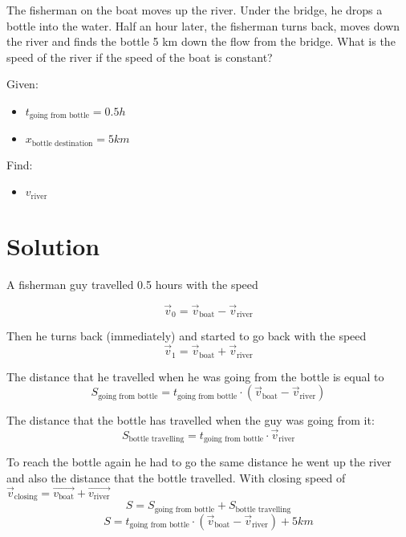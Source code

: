 The fisherman on the boat moves up the river. Under the bridge, he drops a bottle into the water.
Half an hour later, the fisherman turns back, moves down the river and finds the bottle 5 km
down the flow from the bridge. What is the speed of the river if the speed of the boat is constant?

\bigbreak Given: \begin{itemize}
    \item $t_{\text{going from bottle}} = 0.5h$
    \item $x_{\text{bottle destination}} = 5km$
\end{itemize}

Find: \begin{itemize}
    \item $v_{\text{river}}$
\end{itemize}

\section*{Solution}

A fisherman guy travelled 0.5 hours with the speed

$$\Vec{v}_0 = \Vec{v}_{\text{boat}} - \Vec{v}_{\text{river}}$$

Then he turns back (immediately) and started to go back with the speed
\begin{equation}
    \label{eq:1}
    \Vec{v}_1 = \Vec{v}_{\text{boat}} + \Vec{v}_{\text{river}}
\end{equation}

The distance that he travelled when he was going from the bottle is equal to
$$S_{\text{going from bottle}} = t_{\text{going from bottle}} \cdot (\Vec{v}_{\text{boat}} - \Vec{v}_{\text{river}})$$

The distance that the bottle has travelled when the guy was going from it:
$$S_{\text{bottle travelling}} = t_{\text{going from bottle}} \cdot \Vec{v}_{\text{river}}$$

To reach the bottle again he had to go the same distance he went up the river and also the distance that the bottle travelled.
With closing speed of $\Vec{v}_\text{closing} = \Vec{v_\text{boat}} + \Vec{v_\text{river}}$
$$S = S_{\text{going from bottle}} + S_{\text{bottle travelling}}$$
\begin{equation}
    \label{eq:2}
    S = t_{\text{going from bottle}} \cdot (\Vec{v}_{\text{boat}} - \Vec{v}_{\text{river}}) + 5km
\end{equation}

